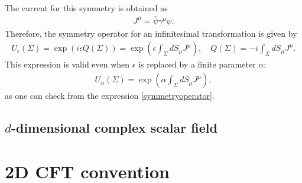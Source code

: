 \documentclass[12pt]{scrartcl}
\newcommand{\psib}{\bar{\psi}}
\begin{document}
The current for this symmetry is obtained as
\begin{align}
    J^{\mu}=\psib \gamma^{\mu} \psi.
\end{align}
Therefore, the symmetry operator for an infinitesimal transformation is given by
\begin{align}
    U_{\epsilon}(\Sigma)=\exp\left(
        i\epsilon Q(\Sigma)
    \right)=\exp\left(
        \epsilon\int_{\Sigma}dS_{\mu}J^{\mu}
    \right),\quad
    Q(\Sigma)=-i\int_{\Sigma}dS_{\mu}J^{\mu}.
\end{align}
This expression is valid even when $\epsilon$ is replaced by a finite parameter $\alpha$:
\begin{align}
    U_{\alpha}(\Sigma)=\exp\left(
        \alpha\int_{\Sigma}dS_{\mu}J^{\mu}
    \right),
\end{align}
as one can check from the expression 
\eqref{symmetryoperator}.


\subsection{$d$-dimensional complex scalar field}


\section{2D CFT convention}


\appendix
\end{document}
